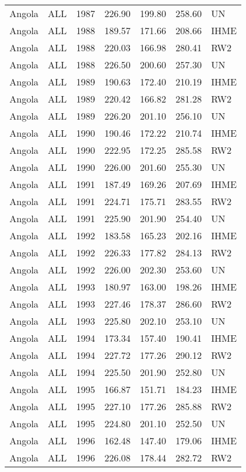 \begin{longtable}{lllrrrl}
  Angola & ALL & 1987 & 226.90 & 199.80 & 258.60 & UN \\ 
  Angola & ALL & 1988 & 189.57 & 171.66 & 208.66 & IHME \\ 
  Angola & ALL & 1988 & 220.03 & 166.98 & 280.41 & RW2 \\ 
  Angola & ALL & 1988 & 226.50 & 200.60 & 257.30 & UN \\ 
  Angola & ALL & 1989 & 190.63 & 172.40 & 210.19 & IHME \\ 
  Angola & ALL & 1989 & 220.42 & 166.82 & 281.28 & RW2 \\ 
  Angola & ALL & 1989 & 226.20 & 201.10 & 256.10 & UN \\ 
  Angola & ALL & 1990 & 190.46 & 172.22 & 210.74 & IHME \\ 
  Angola & ALL & 1990 & 222.95 & 172.25 & 285.58 & RW2 \\ 
  Angola & ALL & 1990 & 226.00 & 201.60 & 255.30 & UN \\ 
  Angola & ALL & 1991 & 187.49 & 169.26 & 207.69 & IHME \\ 
  Angola & ALL & 1991 & 224.71 & 175.71 & 283.55 & RW2 \\ 
  Angola & ALL & 1991 & 225.90 & 201.90 & 254.40 & UN \\ 
  Angola & ALL & 1992 & 183.58 & 165.23 & 202.16 & IHME \\ 
  Angola & ALL & 1992 & 226.33 & 177.82 & 284.13 & RW2 \\ 
  Angola & ALL & 1992 & 226.00 & 202.30 & 253.60 & UN \\ 
  Angola & ALL & 1993 & 180.97 & 163.00 & 198.26 & IHME \\ 
  Angola & ALL & 1993 & 227.46 & 178.37 & 286.60 & RW2 \\ 
  Angola & ALL & 1993 & 225.80 & 202.10 & 253.10 & UN \\ 
  Angola & ALL & 1994 & 173.34 & 157.40 & 190.41 & IHME \\ 
  Angola & ALL & 1994 & 227.72 & 177.26 & 290.12 & RW2 \\ 
  Angola & ALL & 1994 & 225.50 & 201.90 & 252.80 & UN \\ 
  Angola & ALL & 1995 & 166.87 & 151.71 & 184.23 & IHME \\ 
  Angola & ALL & 1995 & 227.10 & 177.26 & 285.88 & RW2 \\ 
  Angola & ALL & 1995 & 224.80 & 201.10 & 252.50 & UN \\ 
  Angola & ALL & 1996 & 162.48 & 147.40 & 179.06 & IHME \\ 
  Angola & ALL & 1996 & 226.08 & 178.44 & 282.72 & RW2 \\ 

\end{longtable}
